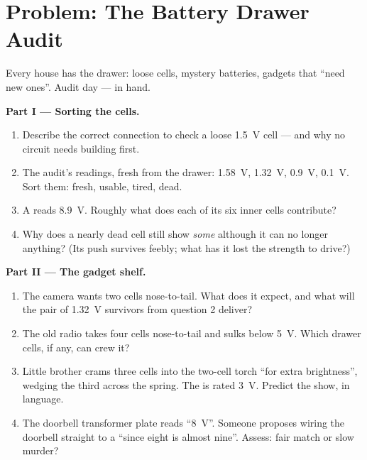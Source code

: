 \section{Problem: The Battery Drawer Audit}

\begin{problem}\label{pb:g8:voltage-voltmeter:1}
Every house has the drawer: loose cells, mystery batteries,
gadgets that ``need new ones''. Audit day ---  in
hand.

\medskip\noindent\textbf{Part I --- Sorting the cells.}
\begin{enumerate}
  \item Describe the correct  connection to check a
        loose \qty{1.5}{V} cell --- and why no circuit needs
        building first.
  \item The audit's readings, fresh from the drawer:
        \qty{1.58}{V}, \qty{1.32}{V}, \qty{0.9}{V},
        \qty{0.1}{V}. Sort them: fresh, usable, tired, dead.
  \item A   reads \qty{8.9}{V}. Roughly what
        does each of its six inner cells contribute?
  \item Why does a nearly dead cell still show \emph{some}
         although it can no longer  anything? (Its
        push survives feebly; what has it lost the strength to
        drive?)
\end{enumerate}

\medskip\noindent\textbf{Part II --- The gadget shelf.}
\begin{enumerate}[resume]
  \item The camera wants two cells nose-to-tail. What 
        does it expect, and what will the pair of
        \qty{1.32}{V} survivors from question 2 deliver?
  \item The old radio takes four cells nose-to-tail and sulks
        below \qty{5}{V}. Which drawer cells, if any, can crew
        it?
  \item Little brother crams three cells into the two-cell
        torch ``for extra brightness'', wedging the third
        across the spring. The  is rated \qty{3}{V}.
        Predict the show, in  language.
  \item The doorbell transformer plate reads ``\qty{8}{V}''.
        Someone proposes wiring the doorbell straight to a
          ``since eight is almost nine''.
        Assess: fair match or slow murder?
\end{enumerate}


\end{problem}
